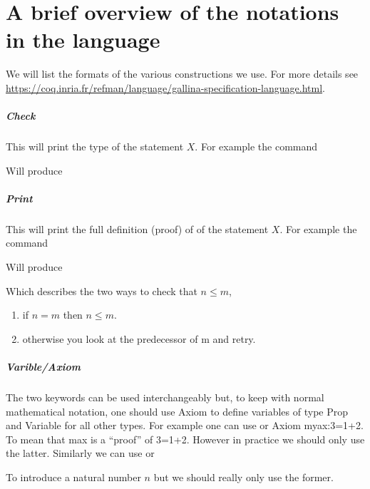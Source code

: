 \chapter{ A brief overview of the notations in the language}



We will list the formats of the various constructions we use. For more details see 
\url{https://coq.inria.fr/refman/language/gallina-specification-language.html}.
\paragraph{\bf Check}{

This will print the type of the statement $X$. For example the command

Will produce

}
\hrulefill
\paragraph{\bf Print}{


This will print the full definition (proof) of of the statement $X$. For example the command

Will produce

Which describes the two ways to check that $n\le m$,
\begin{enumerate}
\item if $n=m$ then $n \le m$.
\item otherwise you look at the predecessor of m and retry.
\end{enumerate}}
\hrulefill
\paragraph{\bf Varible/Axiom}
{

The two keywords can be used interchangeably but, to keep with normal mathematical notation, one should use Axiom to define variables of type Prop and Variable for all other types. For example one can use 
or {Axiom myax:3=1+2.}
To mean that max is a ``proof'' of 3=1+2. However in practice we should only use the latter. Similarly we can use
or 

To introduce a natural number $n$ but we should really only use the former.
}

